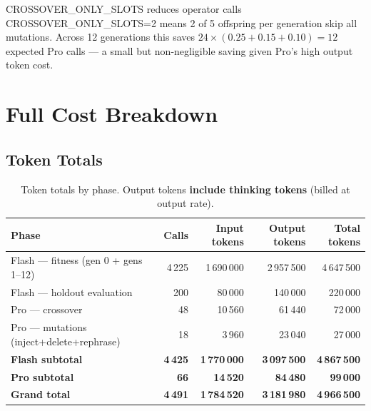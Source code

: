 \documentclass[11pt,a4paper]{report}
\begin{document}
\begin{conceptbox}{CROSSOVER\_ONLY\_SLOTS reduces operator calls}
CROSSOVER\_ONLY\_SLOTS=2 means 2 of 5 offspring per generation skip all mutations.
Across 12 generations this saves $24 \times (0.25 + 0.15 + 0.10) = 12$ expected Pro
calls --- a small but non-negligible saving given Pro's high output token cost.
\end{conceptbox}


\chapter{Full Cost Breakdown}

\section{Token Totals}

\begin{table}[h]
\centering
\begin{tabular}{@{}lrrrr@{}}
\toprule
\textbf{Phase} & \textbf{Calls} & {\textbf{Input tokens}} & {\textbf{Output tokens}} & {\textbf{Total tokens}} \\
\midrule
Flash --- fitness (gen 0 + gens 1--12) & 4\,225 & 1\,690\,000 & 2\,957\,500 & 4\,647\,500 \\
Flash --- holdout evaluation           &   200  &    80\,000  &   140\,000  &   220\,000  \\
Pro --- crossover                      &    48  &    10\,560  &    61\,440  &    72\,000  \\
Pro --- mutations (inject+delete+rephrase) & 18 &    3\,960   &    23\,040  &    27\,000  \\
\midrule
\textbf{Flash subtotal}     & \textbf{4\,425} & \textbf{1\,770\,000} & \textbf{3\,097\,500} & \textbf{4\,867\,500} \\
\textbf{Pro subtotal}       & \textbf{66}     & \textbf{14\,520}     & \textbf{84\,480}     & \textbf{99\,000}     \\
\midrule
\textbf{Grand total}        & \textbf{4\,491} & \textbf{1\,784\,520} & \textbf{3\,181\,980} & \textbf{4\,966\,500} \\
\bottomrule
\end{tabular}
\caption{Token totals by phase.  Output tokens \textbf{include thinking tokens} (billed at output rate).}
\end{table}
\end{document}
